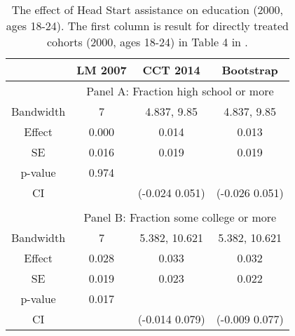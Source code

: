 \documentclass[12pt,fleqn]{article}
\begin{document}
\begin{table}[ht]
	\centering
	\begin{tabular}{cccc}
		\toprule
		& LM 2007 & CCT 2014 & Bootstrap \\
		\midrule
		& \multicolumn{3}{c}{Panel A: Fraction high school or more} \\ 
		Bandwidth & 7 & 4.837, 9.85 & 4.837, 9.85 \\
		Effect    & 0.000 & 0.014 & 0.013 \\
		SE        & 0.016 & 0.019 & 0.019 \\
		p-value   & 0.974 & & \\
		CI        & & (-0.024 0.051) & (-0.026 0.051) \\
		
		&&& \\
		& \multicolumn{3}{c}{Panel B: Fraction some college or more} \\
		Bandwidth & 7 & 5.382, 10.621 & 5.382, 10.621 \\
		Effect    & 0.028 & 0.033 & 0.032 \\
		SE        & 0.019 & 0.023 & 0.022 \\
		p-value   & 0.017 & & \\
		CI        & & (-0.014 0.079) & (-0.009 0.077)\\
		\bottomrule
	\end{tabular}
	\caption{The effect of Head Start assistance on education (2000, ages 18-24). The first column is result for directly treated cohorts (2000, ages 18-24) in Table 4 in \cite{ludwig2007}.}
	\label{tab: education 2000 ages 18-24}
\end{table}
\end{document}
